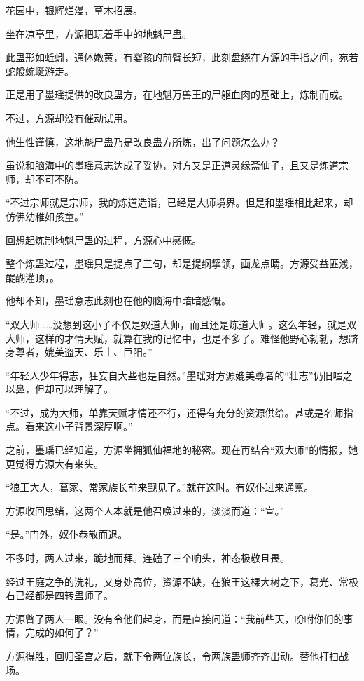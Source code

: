 
\begin{this_body}

花园中，银辉烂漫，草木招展。

坐在凉亭里，方源把玩着手中的地魁尸蛊。

此蛊形如蚯蚓，通体嫩黄，有婴孩的前臂长短，此刻盘绕在方源的手指之间，宛若蛇般蜿蜒游走。

正是用了墨瑶提供的改良蛊方，在地魁万兽王的尸躯血肉的基础上，炼制而成。

不过，方源却没有催动试用。

他生性谨慎，这地魁尸蛊乃是改良蛊方所炼，出了问题怎么办？

虽说和脑海中的墨瑶意志达成了妥协，对方又是正道灵缘斋仙子，且又是炼道宗师，却不可不防。

“不过宗师就是宗师，我的炼道造诣，已经是大师境界。但是和墨瑶相比起来，却仿佛幼稚如孩童。”

回想起炼制地魁尸蛊的过程，方源心中感慨。

整个炼蛊过程，墨瑶只是提点了三句，却是提纲挈领，画龙点睛。方源受益匪浅，醍醐灌顶，。

他却不知，墨瑶意志此刻也在他的脑海中暗暗感慨。

“双大师……没想到这小子不仅是奴道大师，而且还是炼道大师。这么年轻，就是双大师，这样的才情天赋，就算在我的记忆中，也是不多了。难怪他野心勃勃，想跻身尊者，媲美盗天、乐土、巨阳。”

“年轻人少年得志，狂妄自大些也是自然。”墨瑶对方源媲美尊者的“壮志”仍旧嗤之以鼻，但却可以理解了。

“不过，成为大师，单靠天赋才情还不行，还得有充分的资源供给。甚或是名师指点。看来这小子背景深厚啊。”

之前，墨瑶已经知道，方源坐拥狐仙福地的秘密。现在再结合“双大师”的情报，她更觉得方源大有来头。

“狼王大人，葛家、常家族长前来觐见了。”就在这时。有奴仆过来通禀。

方源收回思绪，这两个人本就是他召唤过来的，淡淡而道：“宣。”

“是。”门外，奴仆恭敬而退。

不多时，两人过来，跪地而拜。连磕了三个响头，神态极敬且畏。

经过王庭之争的洗礼，又身处高位，资源不缺，在狼王这棵大树之下，葛光、常极右已经都是四转蛊师了。

方源瞥了两人一眼。没有令他们起身，而是直接问道：“我前些天，吩咐你们的事情，完成的如何了？”

方源得胜，回归圣宫之后，就下令两位族长，令两族蛊师齐齐出动。替他打扫战场。


\end{this_body}
